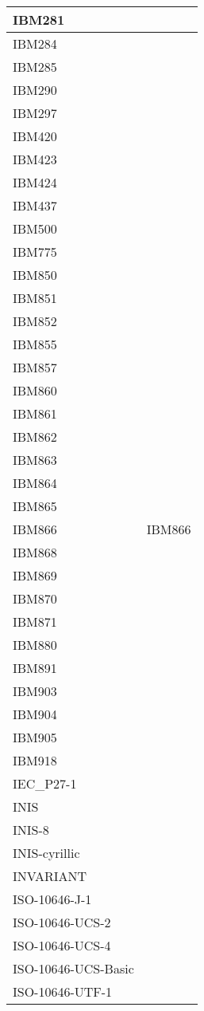 \documentclass{wg21}
\begin{document}
\begin{longtable}{| p{} | p{} |}
IBM281 & \\ \hline
IBM284 & \\ \hline
IBM285 & \\ \hline
IBM290 & \\ \hline
IBM297 & \\ \hline
IBM420 & \\ \hline
IBM423 & \\ \hline
IBM424 & \\ \hline
IBM437 & \\ \hline
IBM500 & \\ \hline
IBM775 & \\ \hline
IBM850 & \\ \hline
IBM851 & \\ \hline
IBM852 & \\ \hline
IBM855 & \\ \hline
IBM857 & \\ \hline
IBM860 & \\ \hline
IBM861 & \\ \hline
IBM862 & \\ \hline
IBM863 & \\ \hline
IBM864 & \\ \hline
IBM865 & \\ \hline
IBM866 & IBM866\\ \hline
IBM868 & \\ \hline
IBM869 & \\ \hline
IBM870 & \\ \hline
IBM871 & \\ \hline
IBM880 & \\ \hline
IBM891 & \\ \hline
IBM903 & \\ \hline
IBM904 & \\ \hline
IBM905 & \\ \hline
IBM918 & \\ \hline
IEC_P27-1 & \\ \hline
INIS & \\ \hline
INIS-8 & \\ \hline
INIS-cyrillic & \\ \hline
INVARIANT & \\ \hline
ISO-10646-J-1 & \\ \hline
ISO-10646-UCS-2 & \\ \hline
ISO-10646-UCS-4 & \\ \hline
ISO-10646-UCS-Basic & \\ \hline
ISO-10646-UTF-1 & \\ \hline

\end{longtable}
\end{document}
